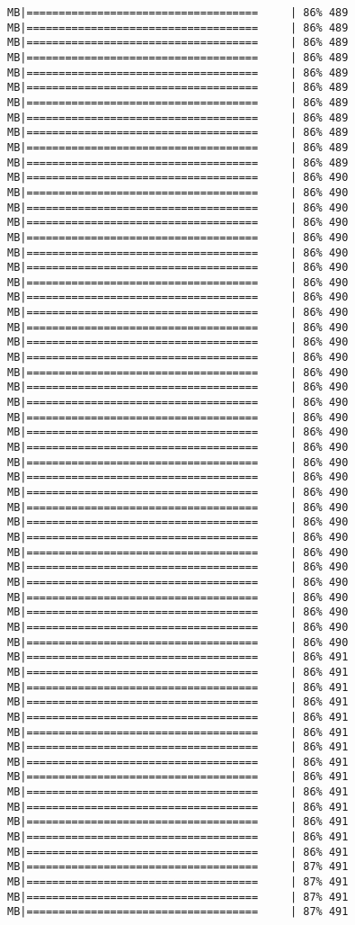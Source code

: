 \documentclass[
]{article}
\begin{document}
\begin{verbatim}
MB|====================================     | 86% 489 MB|====================================     | 86% 489 MB|====================================     | 86% 489 MB|====================================     | 86% 489 MB|====================================     | 86% 489 MB|====================================     | 86% 489 MB|====================================     | 86% 489 MB|====================================     | 86% 489 MB|====================================     | 86% 489 MB|====================================     | 86% 489 MB|====================================     | 86% 489 MB|====================================     | 86% 490 MB|====================================     | 86% 490 MB|====================================     | 86% 490 MB|====================================     | 86% 490 MB|====================================     | 86% 490 MB|====================================     | 86% 490 MB|====================================     | 86% 490 MB|====================================     | 86% 490 MB|====================================     | 86% 490 MB|====================================     | 86% 490 MB|====================================     | 86% 490 MB|====================================     | 86% 490 MB|====================================     | 86% 490 MB|====================================     | 86% 490 MB|====================================     | 86% 490 MB|====================================     | 86% 490 MB|====================================     | 86% 490 MB|====================================     | 86% 490 MB|====================================     | 86% 490 MB|====================================     | 86% 490 MB|====================================     | 86% 490 MB|====================================     | 86% 490 MB|====================================     | 86% 490 MB|====================================     | 86% 490 MB|====================================     | 86% 490 MB|====================================     | 86% 490 MB|====================================     | 86% 490 MB|====================================     | 86% 490 MB|====================================     | 86% 490 MB|====================================     | 86% 490 MB|====================================     | 86% 490 MB|====================================     | 86% 490 MB|====================================     | 86% 491 MB|====================================     | 86% 491 MB|====================================     | 86% 491 MB|====================================     | 86% 491 MB|====================================     | 86% 491 MB|====================================     | 86% 491 MB|====================================     | 86% 491 MB|====================================     | 86% 491 MB|====================================     | 86% 491 MB|====================================     | 86% 491 MB|====================================     | 86% 491 MB|====================================     | 86% 491 MB|====================================     | 86% 491 MB|====================================     | 86% 491 MB|====================================     | 87% 491 MB|====================================     | 87% 491 MB|====================================     | 87% 491 MB|====================================     | 87% 491 
\end{verbatim}
\end{document}

